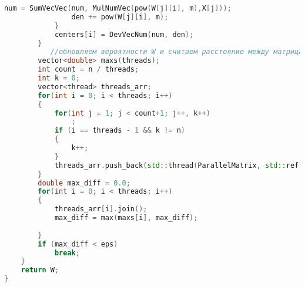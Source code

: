 \par \text{ }
\begin{lstlisting}[language=C++, label=lst:alg:FuzzyPar_1, caption=Параллельный нечёткий алгоритм k-means]
                num = SumVecVec(num, MulNumVec(pow(W[j][i], m),X[j]));
                den += pow(W[j][i], m);
            }
            centers[i] = DevVecNum(num, den);
        }
           //обновляем вероятности W и считаем расстояние между матрицами W и Wprev
        vector<double> maxs(threads);
        int count = n / threads;
        int k = 0;
        vector<thread> threads_arr;
        for(int i = 0; i < threads; i++)
        {
            for(int j = 1; j < count+1; j++, k++)
                ;
            if (i == threads - 1 && k != n)
            {
                k++;
            }
            threads_arr.push_back(std::thread(ParallelMatrix, std::ref(W), std::ref(Wprev), std::ref(maxs[i]),i*count,k,c, X, centers, m));
        }
        double max_diff = 0.0;
        for(int i = 0; i < threads; i++)
        {
            threads_arr[i].join();
            max_diff = max(maxs[i], max_diff);
            
        }
        if (max_diff < eps)
            break;
    }
    return W;
}
        \end{lstlisting}

        
